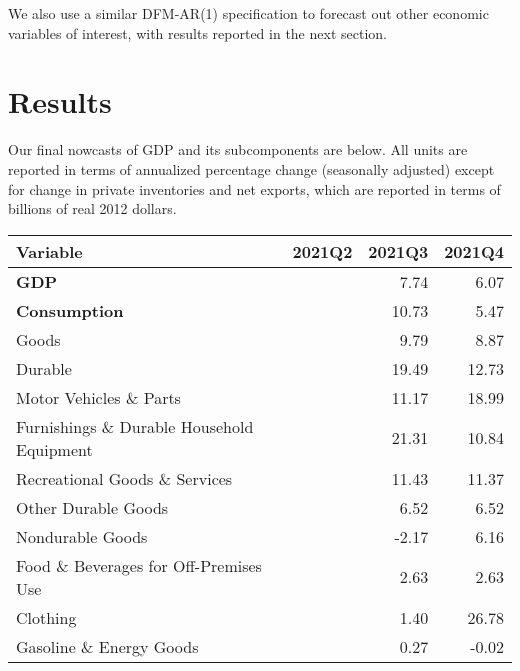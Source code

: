 \documentclass[11pt, letterpaper]{article}\usepackage[]{graphicx}\usepackage[]{color}
\begin{document}
We also use a similar DFM-AR(1) specification to forecast out other economic variables of interest, with results reported in the next section.


\section{Results}
Our final nowcasts of GDP and its subcomponents are below. All units are reported in terms of annualized percentage change (seasonally adjusted) except for change in private inventories and net exports, which are reported in terms of billions of real 2012 dollars.
\begin{table}[H]
\centering
\begingroup\fontsize{10pt}{12pt}\selectfont
\begin{tabular}{lrrr}
  \hline
Variable & 2021Q2 & 2021Q3 & 2021Q4 \\ 
  \hline
\hspace{0mm} \textbf{GDP} &  & 7.74 & 6.07 \\ 
  \hspace{0mm} \textbf{Consumption} &  & 10.73 & 5.47 \\ 
  \hspace{8mm}  Goods &  & 9.79 & 8.87 \\ 
  \hspace{16mm}  Durable &  & 19.49 & 12.73 \\ 
  \hspace{24mm}  Motor Vehicles \& Parts &  & 11.17 & 18.99 \\ 
  \hspace{24mm}  Furnishings \& Durable Household Equipment &  & 21.31 & 10.84 \\ 
  \hspace{24mm}  Recreational Goods \& Services &  & 11.43 & 11.37 \\ 
  \hspace{24mm}  Other Durable Goods &  & 6.52 & 6.52 \\ 
  \hspace{16mm}  Nondurable Goods &  & -2.17 & 6.16 \\ 
  \hspace{24mm}  Food \& Beverages for Off-Premises Use &  & 2.63 & 2.63 \\ 
  \hspace{24mm}  Clothing &  & 1.40 & 26.78 \\ 
  \hspace{24mm}  Gasoline \& Energy Goods &  & 0.27 & -0.02 \\ 

\end{tabular}
\end{table}
\end{document}
